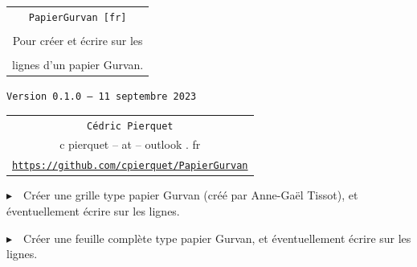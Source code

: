 \documentclass[a4paper]{article}
\def\TPversion{0.1.0}
\def\TPdate{11 septembre 2023}
\begin{document}
\pagestyle{fancy}

\thispagestyle{empty}

\vspace{2cm}

\begin{center}
	\begin{minipage}{0.75\linewidth}
	\begin{tcolorbox}[colframe=yellow,colback=yellow!15]
		\begin{center}
			\begin{tabular}{c}
				{\Huge \texttt{PapierGurvan [fr]}}\\
				\\
				{\LARGE Pour créer et écrire sur les} \\
				\\
				{\LARGE lignes d'un papier Gurvan.}
			\end{tabular}
			
			\medskip
			
			{\small \texttt{Version \TPversion{} -- \TPdate}}
		\end{center}
	\end{tcolorbox}
\end{minipage}
\end{center}

\vspace{0.5cm}

\begin{center}
	\begin{tabular}{c}
	\texttt{Cédric Pierquet}\\
	{\ttfamily c pierquet -- at -- outlook . fr}\\
	\texttt{\url{https://github.com/cpierquet/PapierGurvan}}
\end{tabular}
\end{center}

\vspace{0.5cm}

{$\blacktriangleright$~~Créer une grille type papier Gurvan (créé par Anne-Gaël Tissot), et éventuellement écrire sur les lignes.}

\smallskip

{$\blacktriangleright$~~Créer une feuille complète type papier Gurvan, et éventuellement écrire sur les lignes.}

\vspace{1cm}

\begin{center}
\begin{EnvGurvan}[NbCarreaux=17x5,Interligne=2.5]
\end{EnvGurvan}
\end{center}
\end{document}
